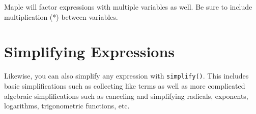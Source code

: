 \begin{maplegroup}
\begin{mapleinput}
\end{mapleinput}
\mapleresult
\begin{maplelatex}
\end{maplelatex}
\end{maplegroup}

Maple will factor expressions with multiple variables as well. Be sure to include multiplication (*) between variables.

\begin{maplegroup}
\begin{mapleinput}
\end{mapleinput}
\mapleresult
\begin{maplelatex}
\end{maplelatex}
\end{maplegroup}

\section{Simplifying Expressions}

Likewise, you can also simplify any expression with \texttt{simplify()}. This includes basic simplifications such as collecting like terms as well as more complicated algebraic simplifications such as canceling and simplifying radicals, exponents, logarithms, trigonometric functions, etc.


\begin{maplegroup}
\begin{mapleinput}
\end{mapleinput}
\mapleresult
\begin{maplelatex}
\end{maplelatex}
\end{maplegroup}



